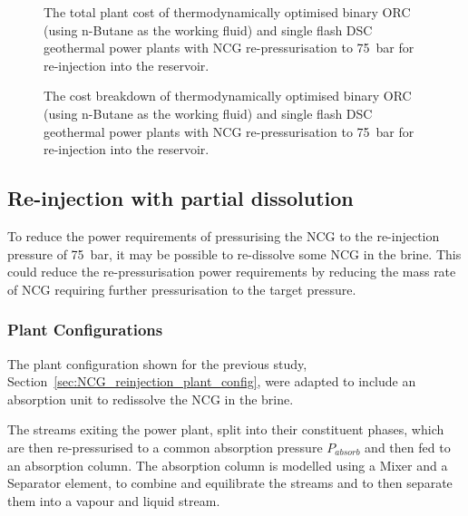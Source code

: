         \begin{figure}[H]
            \centering
            
            \caption[The total plant cost of thermodynamically optimised binary \ac{ORC} and single flash \ac{DSC} geothermal power plants re-injecting \ac{NCG} into the reservoir.]{The total plant cost of thermodynamically optimised binary \ac{ORC} (using n-Butane as the working fluid) and single flash \ac{DSC} geothermal power plants with \ac{NCG} re-pressurisation to \qty{75}{\bar} for re-injection into the reservoir.}
            \label{fig:prosim_NCG_Reinjection_Cost}
        \end{figure}

        \begin{figure}[H]
            \centering
            
            \caption[The cost breakdown of thermodynamically optimised binary \ac{ORC} and single flash \ac{DSC} geothermal power plants re-injecting \ac{NCG} into the reservoir.]{The cost breakdown of thermodynamically optimised binary \ac{ORC} (using n-Butane as the working fluid) and single flash \ac{DSC} geothermal power plants with \ac{NCG} re-pressurisation to \qty{75}{\bar} for re-injection into the reservoir.}
            \label{fig:prosim_NCG_Reinjection_CostBreakdown}
        \end{figure}

\subsection{Re-injection with partial dissolution}
    To reduce the power requirements of pressurising the \ac{NCG} to the re-injection pressure of \qty{75}{\bar}, it may be possible to re-dissolve some \ac{NCG} in the brine. This could reduce the re-pressurisation power requirements by reducing the mass rate of \ac{NCG} requiring further pressurisation to the target pressure. 

    \subsubsection{Plant Configurations}
        The plant configuration shown for the previous study, Section~\ref{sec:NCG_reinjection_plant_config}, were adapted to include an absorption unit to redissolve the \ac{NCG} in the brine. 
        
        The streams exiting the power plant, split into their constituent phases, which are then re-pressurised to a common absorption pressure \(P_{absorb}\) and then fed to an absorption column. The absorption column is modelled using a Mixer and a Separator element, to combine and equilibrate the streams and to then separate them into a vapour and liquid stream. 

